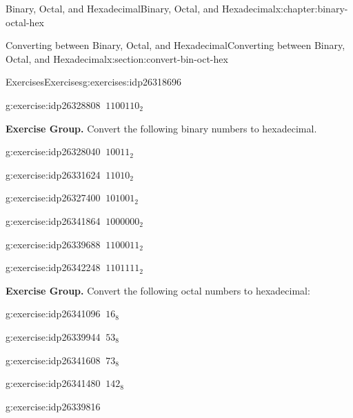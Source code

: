 \documentclass[twoside,10pt,]{book}
\numberwithin{equation}{section}
\begin{document}
\begin{chapterptx}{Binary, Octal, and Hexadecimal}{}{Binary, Octal, and Hexadecimal}{}{}{x:chapter:binary-octal-hex}
\begin{sectionptx}{Converting between Binary, Octal, and Hexadecimal}{}{Converting between Binary, Octal, and Hexadecimal}{}{}{x:section:convert-bin-oct-hex}
\begin{exercises-subsection}{Exercises}{}{Exercises}{}{}{g:exercises:idp26318696}
\begin{exercisegroup}
\begin{divisionexerciseeg}{18}{}{}{g:exercise:idp26328808}
\(\ 1100110_2\)\end{divisionexerciseeg}%
\end{exercisegroup}
\par\medskip\noindent
\par\medskip\noindent%
\textbf{Exercise Group.}\space\space%
Convert the following binary numbers to hexadecimal.\begin{exercisegroup}
\begin{divisionexerciseeg}{19}{}{}{g:exercise:idp26328040}%
\(\ 10011_2\)\end{divisionexerciseeg}%
\begin{divisionexerciseeg}{20}{}{}{g:exercise:idp26331624}%
\(\ 11010_2\)\end{divisionexerciseeg}%
\begin{divisionexerciseeg}{21}{}{}{g:exercise:idp26327400}%
\(\ 101001_2\)\end{divisionexerciseeg}%
\begin{divisionexerciseeg}{22}{}{}{g:exercise:idp26341864}%
\(\ 1000000_2\)\end{divisionexerciseeg}%
\begin{divisionexerciseeg}{23}{}{}{g:exercise:idp26339688}%
\(\ 1100011_2\)\end{divisionexerciseeg}%
\begin{divisionexerciseeg}{24}{}{}{g:exercise:idp26342248}%
\(\ 1101111_2\)\end{divisionexerciseeg}%
\end{exercisegroup}
\par\medskip\noindent
\par\medskip\noindent%
\textbf{Exercise Group.}\space\space%
Convert the following octal numbers to hexadecimal:\begin{exercisegroup}
\begin{divisionexerciseeg}{25}{}{}{g:exercise:idp26341096}%
\(\ 16_8\)\end{divisionexerciseeg}%
\begin{divisionexerciseeg}{26}{}{}{g:exercise:idp26339944}%
\(\ 53_8\)\end{divisionexerciseeg}%
\begin{divisionexerciseeg}{27}{}{}{g:exercise:idp26341608}%
\(\ 73_8\)\end{divisionexerciseeg}%
\begin{divisionexerciseeg}{28}{}{}{g:exercise:idp26341480}%
\(\ 142_8\)\end{divisionexerciseeg}%
\begin{divisionexerciseeg}{29}{}{}{g:exercise:idp26339816}%

\end{divisionexerciseeg}
\end{exercisegroup}
\end{exercises-subsection}
\end{sectionptx}
\end{chapterptx}
\end{document}
